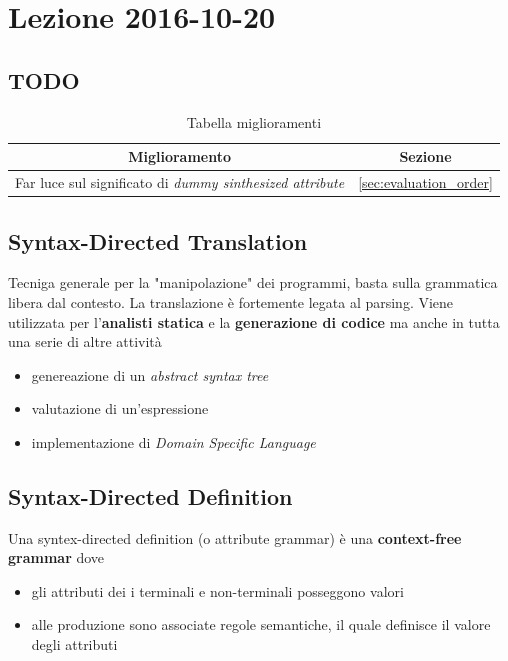 \section{Lezione 2016-10-20}
\subsection{TODO}
\begin{table}[ht]
\begin{center}
\begin{tabular}{|p{\textwidth}|c|}
\hline
\multicolumn{1}{|c|}{\textbf{Miglioramento}} & \textbf{Sezione} \\ \hline
Far luce sul significato di \textit{dummy sinthesized attribute} &
\ref{sec:evaluation_order} \\ \hline
\end{tabular}
\end{center}
\caption{Tabella miglioramenti}
\label{tab:tab_todo}
\end{table}

\subsection{Syntax-Directed Translation}
Tecniga generale per la "manipolazione" dei programmi, basta sulla grammatica
libera dal contesto. La translazione \`e fortemente legata al parsing. Viene
utilizzata per l'\textbf{analisti statica} e la \textbf{generazione di codice}
ma anche in tutta una serie di altre attivit\`a
\begin{itemize}
\item genereazione di un \textit{abstract syntax tree}
\item valutazione di un'espressione
\item implementazione di \textit{Domain Specific Language}
\end{itemize}

\subsection{Syntax-Directed Definition}
\begin{definition}
Una syntex-directed definition (o attribute grammar) \`e una
\textbf{context-free grammar} dove
\begin{itemize}
\item gli attributi dei i terminali e non-terminali posseggono valori
\item alle produzione sono associate regole semantiche, il quale definisce il
valore degli attributi
\end{itemize}
\end{definition}

